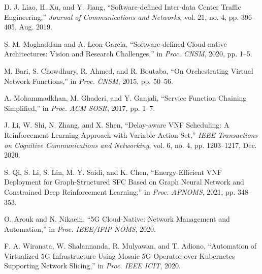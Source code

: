 \documentclass[conference]{IEEEtran}
\begin{document}
\begin{thebibliography}{99}

D. J. Liao, H. Xu, and Y. Jiang, ``Software-defined Inter-data Center Traffic Engineering,'' \textit{Journal of Communications and Networks}, vol. 21, no. 4, pp. 396--405, Aug. 2019.

S. M. Moghaddam and A. Leon-Garcia, ``Software-defined Cloud-native Architectures: Vision and Research Challenges,'' in \textit{Proc. CNSM}, 2020, pp. 1--5.

M. Bari, S. Chowdhury, R. Ahmed, and R. Boutaba, ``On Orchestrating Virtual Network Functions,'' in \textit{Proc. CNSM}, 2015, pp. 50--56.

A. Mohammadkhan, M. Ghaderi, and Y. Ganjali, ``Service Function Chaining Simplified,'' in \textit{Proc. ACM SOSR}, 2017, pp. 1--7.

J. Li, W. Shi, N. Zhang, and X. Shen, ``Delay-aware VNF Scheduling: A Reinforcement Learning Approach with Variable Action Set,'' \textit{IEEE Transactions on Cognitive Communications and Networking}, vol. 6, no. 4, pp. 1203--1217, Dec. 2020.

S. Qi, S. Li, S. Lin, M. Y. Saidi, and K. Chen, ``Energy-Efficient VNF Deployment for Graph-Structured SFC Based on Graph Neural Network and Constrained Deep Reinforcement Learning,'' in \textit{Proc. APNOMS}, 2021, pp. 348--353.

O. Arouk and N. Nikaein, ``5G Cloud-Native: Network Management and Automation,'' in \textit{Proc. IEEE/IFIP NOMS}, 2020.

F. A. Wiranata, W. Shalannanda, R. Mulyawan, and T. Adiono, ``Automation of Virtualized 5G Infrastructure Using Mosaic 5G Operator over Kubernetes Supporting Network Slicing,'' in \textit{Proc. IEEE ICIT}, 2020.

\end{thebibliography}
\end{document}
